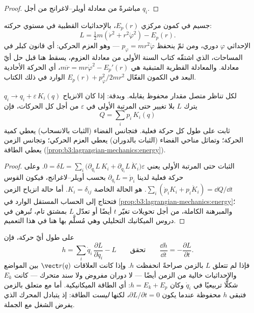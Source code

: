 \begin{proof}
مباشرةً من معادلة أويلر--لاغرانج من أجل $q_i$.
\end{proof}

\begin{example}\label{ex:b3:lagrangian-mechanics:central}
جسيم في كمون مركزي $E_p(r)$، بالإحداثيات القطبية في مستوي
حركته:
\[
L = \tfrac12 m(\dot r^2 + r^2\dot\varphi^2) - E_p(r) .
\]
الإحداثي $\varphi$ دوري، ومن ثمّ ينحفظ $p_\varphi = mr^2\dot\varphi$
--- وهو العزم الحركي: أي قانون كبلر في المساحات، الذي اشتقّه كتاب
السنة الأولى من معادلة العزوم، يسقط هنا قبل حل أيّ معادلة.
والمعادلة القطرية المتبقية هي
$m\ddot r = mr\dot\varphi^2 - E_p'(r)$، أي الحركة الأحادية البعد في
الكمون الفعّال $E_p(r) + p_\varphi^2/2mr^2$ الوارد في ذلك
الكتاب.
\end{example}

\begin{theorem}\label{thm:b3:lagrangian-mechanics:noether}
لكل تناظر متصل  مقدار محفوظ يقابله. وبدقة: إذا كان
الانزياح $q_i \to q_i + \varepsilon\,K_i(q)$ يترك $L$ بلا تغيير
حتى المرتبة الأولى في $\varepsilon$ من أجل كل الحركات، فإن
\[
Q = \sum_i p_i\,K_i(q)
\]
ثابت على طول كل حركة فعلية. فتجانس الفضاء (الثبات بالانسحاب) يعطي
كمية الحركة؛ وتماثل مناحي الفضاء (الثبات بالدوران) يعطي العزم
الحركي؛ وتجانس الزمن يعطي الطاقة
(\cref{prop:b3:lagrangian-mechanics:energy}).
\end{theorem}

\begin{proof}
الثبات حتى المرتبة الأولى يعني
$0 = \delta L = \sum_i\big(\partial_{q_i}L\,K_i +
\partial_{\dot q_i}L\,\dot K_i\big)\varepsilon$. وعلى حركة فعلية
لدينا $\partial_{q_i}L = \dot p_i$ بحسب أويلر--لاغرانج، فيكون
القوس $\sum_i(\dot p_iK_i + p_i\dot K_i) = \dd Q/\dd t$.  هو الحالة الخاصة $K_i = \delta_{ij}$. أما حالة انزياح الزمن
فتحتاج إلى الحساب المستقل الوارد في
\cref{prop:b3:lagrangian-mechanics:energy}؛ والمبرهنة الكاملة، من
أجل تحويلات تغيّر $t$ أيضًا أو تعدّل $L$ بمشتق تام، تُبرهن في
دروس الميكانيك التحليلي وهي مُسلَّم بها هنا في هذا التعميم.
\end{proof}

\begin{proposition}\label{prop:b3:lagrangian-mechanics:energy}
على طول أيّ حركة، فإن \emph{}
\[
h = \sum_i \dot q_i\,\frac{\partial L}{\partial\dot q_i} - L
\qquad\text{تحقق}\qquad
\frac{\dd h}{\dd t} = -\frac{\partial L}{\partial t} .
\]
فإذا لم تتعلق $L$ بالزمن صراحةً انحفظت $h$. وإذا كانت العلاقات
$\vect r(q)$ بين المواضع والإحداثيات خالية من الزمن أيضًا --- لا
دوران مفروض ولا سند متحرك --- كانت $E_k$ شكلًّا تربيعيًا في
$\dot q_i$ وكان $h = E_k + E_p$: أي الطاقة الميكانيكية. أما مع 
متعلق بالزمن فتبقى $h$ محفوظة عندما يكون
$\partial L/\partial t = 0$، لكنها \emph{ليست} الطاقة: إذ يتبادل
المحرك الذي يفرض  الشغل مع الجملة.
\end{proposition}

